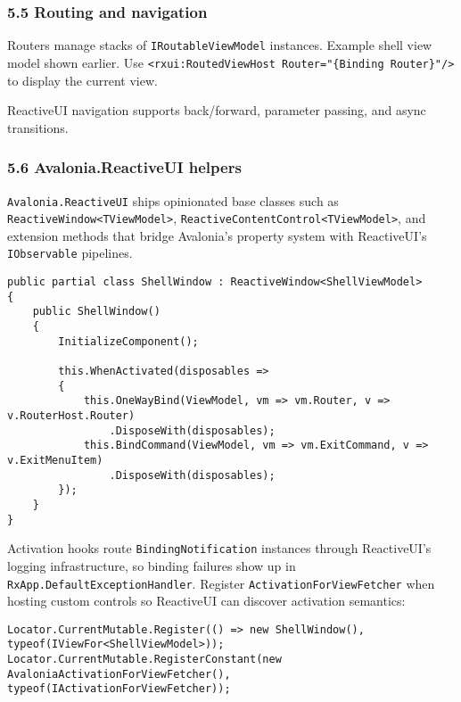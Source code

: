 \subsubsection{5.5 Routing and navigation}\label{routing-and-navigation}

Routers manage stacks of \passthrough{\lstinline!IRoutableViewModel!}
instances. Example shell view model shown earlier. Use
\passthrough{\lstinline!<rxui:RoutedViewHost Router="\{Binding Router\}"/>!}
to display the current view.

ReactiveUI navigation supports back/forward, parameter passing, and
async transitions.

\subsubsection{5.6 Avalonia.ReactiveUI
helpers}\label{avalonia.reactiveui-helpers}

\passthrough{\lstinline!Avalonia.ReactiveUI!} ships opinionated base
classes such as \passthrough{\lstinline!ReactiveWindow<TViewModel>!},
\passthrough{\lstinline!ReactiveContentControl<TViewModel>!}, and
extension methods that bridge Avalonia's property system with
ReactiveUI's \passthrough{\lstinline!IObservable!} pipelines.

\begin{lstlisting}
public partial class ShellWindow : ReactiveWindow<ShellViewModel>
{
    public ShellWindow()
    {
        InitializeComponent();

        this.WhenActivated(disposables =>
        {
            this.OneWayBind(ViewModel, vm => vm.Router, v => v.RouterHost.Router)
                .DisposeWith(disposables);
            this.BindCommand(ViewModel, vm => vm.ExitCommand, v => v.ExitMenuItem)
                .DisposeWith(disposables);
        });
    }
}
\end{lstlisting}

Activation hooks route \passthrough{\lstinline!BindingNotification!}
instances through ReactiveUI's logging infrastructure, so binding
failures show up in
\passthrough{\lstinline!RxApp.DefaultExceptionHandler!}. Register
\passthrough{\lstinline!ActivationForViewFetcher!} when hosting custom
controls so ReactiveUI can discover activation semantics:

\begin{lstlisting}
Locator.CurrentMutable.Register(() => new ShellWindow(), typeof(IViewFor<ShellViewModel>));
Locator.CurrentMutable.RegisterConstant(new AvaloniaActivationForViewFetcher(), typeof(IActivationForViewFetcher));
\end{lstlisting}

